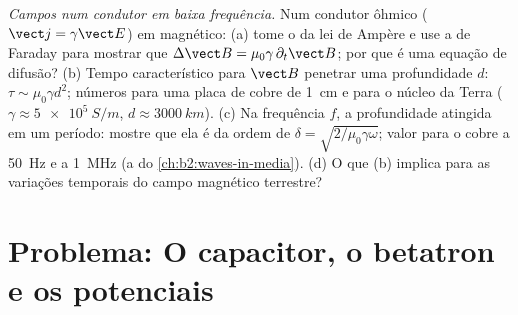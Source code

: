 \begin{exercise}[$\star\star\star$]\label{exo:b2:maxwell-equations:12}
\emph{Campos num condutor em baixa frequência.} Num condutor ôhmico
($\vect j = \gamma\vect E$) em  magnético: (a) tome
o  da lei de Ampère e use a de Faraday para mostrar que $\Delta\vect B = \mu_0\gamma\,
\partial_t\vect B$; por que é uma equação de difusão? (b) Tempo característico
para $\vect B$ penetrar uma profundidade $d$: $\tau \sim \mu_0\gamma d^2$; números para uma
placa de cobre de \qty{1}{cm} e para o núcleo da Terra ($\gamma \approx \qty{5e5}{S/m}$,
$d \approx \qty{3000}{km}$). (c) Na frequência $f$, a profundidade atingida em um
período: mostre que ela é da ordem de $\delta = \sqrt{2/\mu_0\gamma\omega}$; valor para o cobre
a \qty{50}{Hz} e a \qty{1}{MHz} (a  do
\cref{ch:b2:waves-in-media}). (d) O que (b) implica para as variações
temporais do campo magnético terrestre?
\end{exercise}

\section{Problema: O capacitor, o betatron e os potenciais}


